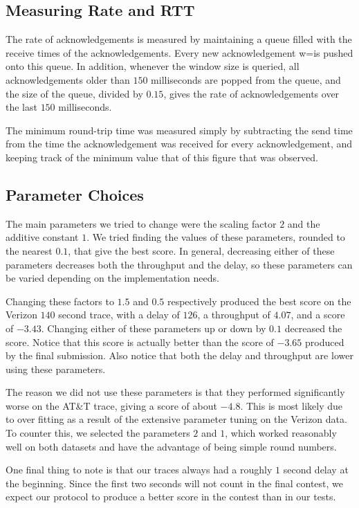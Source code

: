\documentclass[a4paper,10pt]{article}
\begin{document}
\subsection{Measuring Rate and RTT}
The rate of acknowledgements is measured by maintaining a queue filled with the receive times
of the acknowledgements. Every new acknowledgement w=is pushed onto this queue. In
addition, whenever the window size is queried, all acknowledgements older than $150$ milliseconds
are popped from the queue, and the size of the queue, divided by $0.15$, gives the rate of acknowledgements
over the last $150$ milliseconds.

The minimum round-trip time was measured simply by subtracting the send time from the time the
acknowledgement was received for every acknowledgement, and keeping track of the minimum value
that of this figure that was observed.

\subsection{Parameter Choices}
The main parameters we tried to change were the scaling factor $2$ and the additive constant $1$.
We tried finding the values of these parameters, rounded to the nearest $0.1$, that give the best score.
In general, decreasing either of these parameters decreases both the throughput and the delay, so these
parameters can be varied depending on the implementation needs.

Changing these factors to $1.5$ and $0.5$ respectively produced the best score on the Verizon $140$
second trace, with a delay of $126$, a throughput of $4.07$, and a score of $-3.43$. Changing either of these parameters up or down by $0.1$ decreased the score. Notice that this score is actually better
than the score of $-3.65$ produced by the final submission. Also notice that both the delay and
throughput are lower using these parameters.

The reason we did not use these parameters is that they performed significantly worse on the AT\&T trace,
giving a score of about $-4.8$. This is most likely due to over fitting as a result of the extensive parameter
tuning on the Verizon data. To counter this, we selected the parameters $2$ and $1$, which worked
reasonably well on both datasets and have the advantage of being simple round numbers.

One final thing to note is that our traces always had a roughly $1$ second delay at the beginning.
Since the first two seconds will not count in the final contest, we expect our protocol to produce
a better score in the contest than in our tests.
\end{document}
